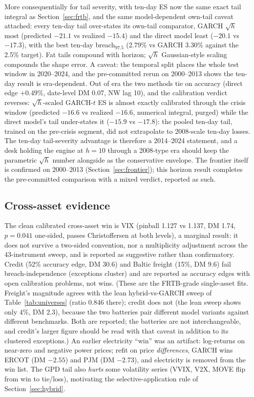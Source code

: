 \documentclass[11pt]{article}
\theoremstyle{remark}
\begin{document}
More consequentially for tail severity, with ten-day ES now the same exact tail integral as Section~\ref{sec:frtb}, and the same
model-dependent own-tail caveat attached: every ten-day tail
over-states its own-tail comparator, GARCH $\sqrt{h}$ most (predicted
$-21.1$ vs realized $-15.4$) and the direct model least
($-20.1$ vs $-17.3$), with the best ten-day breach$_{97.5}$ (2.79\%
vs GARCH 3.30\% against the 2.5\% target). Fat
tails compound with horizon; $\sqrt{h}$ Gaussian-style scaling
compounds the shape error. A caveat: the temporal split places the whole
test window in 2020--2024, and the pre-committed rerun on 2000--2013 shows
the ten-day result is era-dependent. Out of era the two methods tie on
accuracy (direct edge $+0.49\%$, date-level DM 0.07, NW lag 10), and
the calibration verdict reverses: $\sqrt{h}$-scaled GARCH-$t$ ES is
almost exactly calibrated through the crisis window (predicted
$-16.6$ vs realized $-16.6$, numerical integral, purged) while the
direct model's tail under-states it ($-15.9$ vs $-17.8$): the pooled ten-day tail,
trained on the pre-crisis segment, did not extrapolate to 2008-scale
ten-day losses. The ten-day tail-severity advantage
is therefore a 2014--2024 statement,
and a desk holding the engine at $h=10$ through a 2008-type era should
keep the parametric $\sqrt{h}$ number alongside as the conservative
envelope. The frontier itself is confirmed on 2000--2013
(Section~\ref{sec:frontier}); this horizon result completes the
pre-committed comparison with a mixed verdict, reported as such.

\subsection{Cross-asset evidence}

The clean calibrated cross-asset win is VIX (pinball 1.127 vs 1.137, DM
1.74, $p=0.041$ one-sided, passes Christoffersen at both levels), a
marginal result: it does not survive a two-sided convention, nor a
multiplicity adjustment across the 43-instrument sweep, and is reported
as suggestive rather than confirmatory. Credit (52\%
accuracy edge, DM 30.6) and Baltic freight (15\%, DM 9.6) fail
breach-independence (exceptions cluster) and are reported as
accuracy edges with open calibration problems, not wins. (These are the
FRTB-grade single-asset fits. Freight's magnitude agrees with the lean
hybrid-vs-GARCH sweep of Table~\ref{tab:universes} (ratio 0.846 there);
credit does not (the lean sweep shows only $4\%$, DM 2.3), because
the two batteries pair different model variants against different
benchmarks. Both are reported; the batteries are not interchangeable,
and credit's larger figure should be read with that caveat in addition
to its clustered exceptions.) An earlier
electricity ``win'' was an artifact: log-returns on near-zero and
negative power prices; refit on price \emph{differences}, GARCH wins
ERCOT (DM $-2.55$) and PJM (DM $-2.73$), and electricity is removed
from the win list. The GPD tail also \emph{hurts} some volatility
series (VVIX, V2X, MOVE flip from win to tie/loss), motivating the
selective-application rule of Section~\ref{sec:hybrid}.
\end{document}

